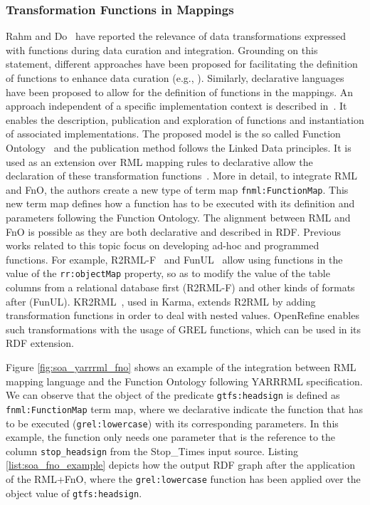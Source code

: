 \subsubsection{Transformation Functions in Mappings}
Rahm and Do~\citep{rahm2000data} have reported the relevance of data transformations expressed with functions during data curation and integration. Grounding on this statement, different approaches have been proposed for facilitating the definition of functions to enhance data curation (e.g., \citep{galhardas2001declarative,GuptaSKGTM12,raman2001potter}). Similarly, declarative languages have been proposed to allow for the definition of functions in the mappings. An approach independent of a specific implementation context is described in~\citep{demeester2019implementation}. It enables the description, publication and exploration of functions and instantiation of associated implementations. The proposed model is the so called Function Ontology~\citep{de2016ontology} and the publication method follows the Linked Data principles. It is used as an extension over RML mapping rules to declarative allow the declaration of these transformation functions~\citep{de2017declarative}. More in detail, to integrate RML and FnO, the authors create a new type of term map \texttt{fnml:FunctionMap}. This new term map defines how a function has to be executed with its definition and parameters following the Function Ontology. The alignment between RML and FnO is possible as they are both declarative and described in RDF. Previous works related to this topic focus on developing ad-hoc and programmed functions. For example, R2RML-F~\citep{debruyne2016r2rml} and FunUL~\cite{junior2016funul,junior2016incorporating} allow using functions in the value of the \texttt{rr:objectMap} property, so as to modify the value of the table columns from a relational database first (R2RML-F) and other kinds of formats after (FunUL). KR2RML~\citep{slepicka2015kr2rml}, used in Karma, extends R2RML by adding transformation functions in order to deal with nested values. OpenRefine enables such transformations with the usage of GREL functions, which can be used in its RDF extension. 


Figure \ref{fig:soa_yarrrml_fno} shows an example of the integration between RML mapping language and the Function Ontology following YARRRML specification. We can observe that the object of the predicate \texttt{gtfs:headsign} is defined as \texttt{fnml:FunctionMap} term map, where we declarative indicate the function that has to be executed (\texttt{grel:lowercase}) with its corresponding parameters. In this example, the function only needs one parameter that is the reference to the column \texttt{stop\_headsign} from the Stop\_Times input source. Listing \ref{list:soa_fno_example} depicts how the output RDF graph after the application of the RML+FnO, where the \texttt{grel:lowercase} function has been applied over the object value of \texttt{gtfs:headsign}.

